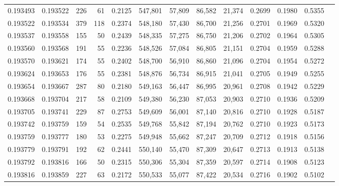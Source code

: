 \begin{tabular}{rrrrrrrrrrrrr}
0.193493 & 0.193522 &   226 &  61 &                                     0.2125 & 547,801 &  57,809 &  86,582 &  21,374 & 0.2699 & 0.1980 & 0.5355 \\
0.193522 & 0.193534 &   379 & 118 &                                     0.2374 & 548,180 &  57,430 &  86,700 &  21,256 & 0.2701 & 0.1969 & 0.5320 \\
0.193537 & 0.193558 &   155 &  50 &                                     0.2439 & 548,335 &  57,275 &  86,750 &  21,206 & 0.2702 & 0.1964 & 0.5305 \\
0.193560 & 0.193568 &   191 &  55 &                                     0.2236 & 548,526 &  57,084 &  86,805 &  21,151 & 0.2704 & 0.1959 & 0.5288 \\
0.193570 & 0.193621 &   174 &  55 &                                     0.2402 & 548,700 &  56,910 &  86,860 &  21,096 & 0.2704 & 0.1954 & 0.5272 \\
0.193624 & 0.193653 &   176 &  55 &                                     0.2381 & 548,876 &  56,734 &  86,915 &  21,041 & 0.2705 & 0.1949 & 0.5255 \\
0.193654 & 0.193667 &   287 &  80 &                                     0.2180 & 549,163 &  56,447 &  86,995 &  20,961 & 0.2708 & 0.1942 & 0.5229 \\
0.193668 & 0.193704 &   217 &  58 &                                     0.2109 & 549,380 &  56,230 &  87,053 &  20,903 & 0.2710 & 0.1936 & 0.5209 \\
0.193705 & 0.193741 &   229 &  87 &                                     0.2753 & 549,609 &  56,001 &  87,140 &  20,816 & 0.2710 & 0.1928 & 0.5187 \\
0.193742 & 0.193759 &   159 &  54 &                                     0.2535 & 549,768 &  55,842 &  87,194 &  20,762 & 0.2710 & 0.1923 & 0.5173 \\
0.193759 & 0.193777 &   180 &  53 &                                     0.2275 & 549,948 &  55,662 &  87,247 &  20,709 & 0.2712 & 0.1918 & 0.5156 \\
0.193779 & 0.193791 &   192 &  62 &                                     0.2441 & 550,140 &  55,470 &  87,309 &  20,647 & 0.2713 & 0.1913 & 0.5138 \\
0.193792 & 0.193816 &   166 &  50 &                                     0.2315 & 550,306 &  55,304 &  87,359 &  20,597 & 0.2714 & 0.1908 & 0.5123 \\
0.193816 & 0.193859 &   227 &  63 &                                     0.2172 & 550,533 &  55,077 &  87,422 &  20,534 & 0.2716 & 0.1902 & 0.5102 \\

\end{tabular}
